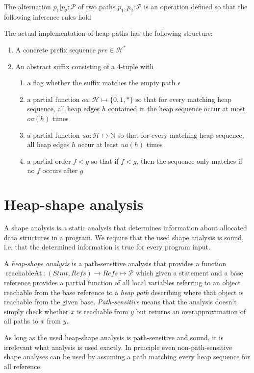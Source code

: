 \begin{definition}[Alternation]
The alternation $p_1|p_2 : \mathcal{P}$ of two paths $p_1, p_2 : \mathcal{P}$ is an operation defined so that the following inference rules hold
\end{definition}

\begin{remark}
The actual implementation of heap paths has the following structure:
\begin{enumerate}
    \item A concrete prefix sequence $pre \in \mathcal{H}^*$
    \item An abstract suffix consisting of a 4-tuple with
     \begin{enumerate}
         \item a flag whether the suffix matches the empty path $\epsilon$
         \item a partial function $oa : \mathcal{H} \mapsto \{0,1,*\}$  so that for every matching heap sequence, all heap edges $h$ contained in the heap sequence occur at most $oa(h)$ times
         \item a partial function $ua : \mathcal{H} \mapsto \mathbb{N}$ so that for every matching heap sequence, all heap edges $h$ occur at least $ua(h)$ times
         \item a partial order $f < g$ so that if $f < g$, then the sequence only matches if no $f$ occurs after $g$
     \end{enumerate}
\end{enumerate}
\end{remark}

\section{Heap-shape analysis}
A shape analysis is a static analysis that determines information about allocated data structures in a program. We require that the used shape analysis is sound, i.e. that the determined information is true for every program input.

\begin{definition}
A \emph{heap-shape analysis} is a path-sensitive analysis that provides a function $\operatorname{reachableAt} : (\mathit{Stmt}, \mathit{Refs}) \to \mathit{Refs} \mapsto \mathcal{P}$  which given a statement and a base reference provides a partial function of all local variables referring to an object reachable from the base reference to a \emph{heap path} describing where that object is reachable from the given base. \emph{Path-sensitive} means that the analysis doesn't simply check whether $x$ is reachable from $y$ but returns an overapproximation of all paths to $x$ from $y$.
\end{definition}
As long as the used heap-shape analysis is path-sensitive and sound, it is irrelevant what analysis is used exactly. In principle even non-path-sensitive shape analyses can be used by assuming a path matching every heap sequence for all reference.

